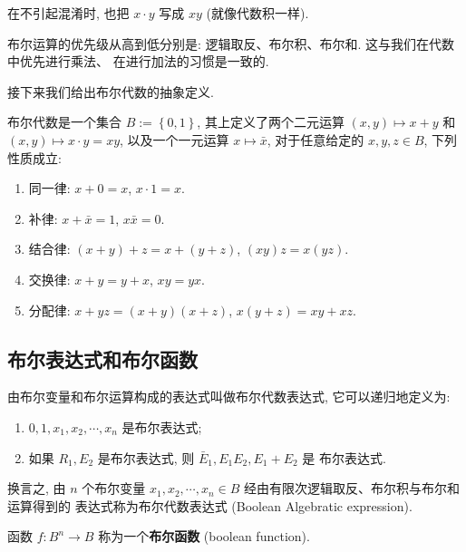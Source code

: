 \documentclass[10pt,UTF8]{book} %
\begin{document}
在不引起混淆时, 也把 $x \cdot y$ 写成 $xy$ (就像代数积一样).

布尔运算的优先级从高到低分别是: 逻辑取反、布尔积、布尔和. 这与我们在代数中优先进行乘法、
在进行加法的习惯是一致的.

接下来我们给出布尔代数的抽象定义.

\begin{definition}[布尔代数]
    \label{def: boolean_algebra}
    布尔代数是一个集合 $B := \left\{0, 1\right\}$, 其上定义了两个二元运算 
    $(x,y) \mapsto x+y$ 和 $(x,y) \mapsto x \cdot y = xy$,
    以及一个一元运算 $x \mapsto \bar x$, 对于任意给定的 $x,y,z \in B$, 下列性质成立:
    \begin{enumerate}[label={$\left.\mathrm{B_\arabic*}\right)$}, itemsep=0pt]
        \item 同一律: $x+0 = x$, $x \cdot 1 = x$.
        \item 补律: $x + \bar x = 1$, $x\bar x = 0$.
        \item 结合律: $(x+y)+z = x+(y+z)$, $(xy)z = x(yz)$.
        \item 交换律: $x+y = y+x$, $xy = yx$.
        \item 分配律: $x+yz = (x+y)(x+z)$, $x(y+z) = xy+xz$.
    \end{enumerate}
\end{definition}

\subsection{布尔表达式和布尔函数}

\begin{definition}
    由布尔变量和布尔运算构成的表达式叫做布尔代数表达式, 它可以递归地定义为:
    \begin{enumerate}[label={${\arabic*}^\circ$}, itemsep=0pt]
        \item $0, 1, x_1, x_2, \cdots, x_n$ 是布尔表达式;
        \item 如果 $R_1, E_2$ 是布尔表达式, 则 $\bar E_1, E_1E_2, E_1 + E_2$ 是
        布尔表达式.
    \end{enumerate}
    换言之, 由 $n$ 个布尔变量 $x_1, x_2, \cdots, x_n \in B$ 经由有限次逻辑取反、布尔积与布尔和运算得到的
    表达式称为布尔代数表达式 (Boolean Algebratic expression).
\end{definition}



\begin{definition}
    函数 $f: B^n \to B$ 称为一个\textbf{布尔函数} (boolean function). 
\end{definition}
\end{document}
